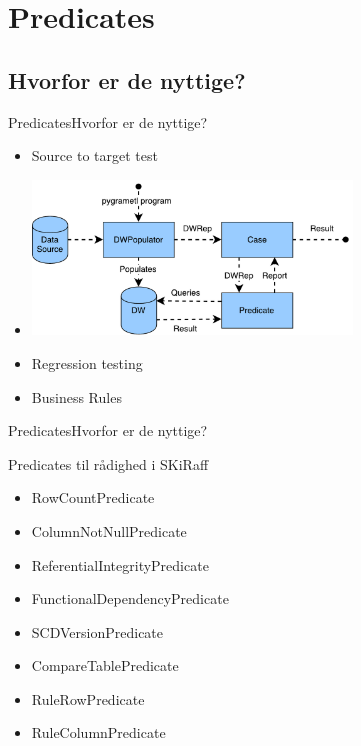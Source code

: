 
\section{Predicates}

\subsection{Hvorfor er de nyttige?}
\begin{frame}{Predicates}{Hvorfor er de nyttige?}
	\begin{itemize}
		\item<1-> Source to target test
		\item<1->[] \includegraphics[width=8.5cm]{figures/overview.pdf}
		\item<2-> Regression testing
		\item<3-> Business Rules
	\end{itemize}
\end{frame}

\begin{frame}{Predicates}{Hvorfor er de nyttige?}
	\begin{block}{Predicates til rådighed i SKiRaff}
		\begin{itemize}
			\item<1-> RowCountPredicate
			\item<1-> ColumnNotNullPredicate
			\item<1-> ReferentialIntegrityPredicate
			\item<1-> FunctionalDependencyPredicate
			\item<1-> SCDVersionPredicate
			\item<1-> CompareTablePredicate
			\item<1-> RuleRowPredicate
			\item<1-> RuleColumnPredicate
		\end{itemize}
	\end{block}
\end{frame}

